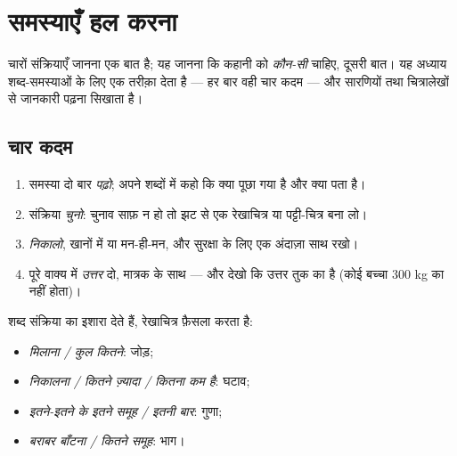 \chapter{समस्याएँ हल करना}\label{ch:g3:problems}

चारों संक्रियाएँ जानना एक बात है; यह जानना कि कहानी को
\emph{कौन-सी} चाहिए, दूसरी बात। यह अध्याय शब्द-समस्याओं के लिए
एक तरीक़ा देता है --- हर बार वही चार कदम --- और सारणियों तथा
चित्रालेखों से जानकारी पढ़ना सिखाता है।

\section{चार कदम}

\begin{method}\label{met:g3:problems:steps}
\begin{enumerate}
  \item समस्या दो बार \emph{पढ़ो}; अपने शब्दों में कहो कि क्या
        पूछा गया है और क्या पता है।
  \item संक्रिया \emph{चुनो}: चुनाव साफ़ न हो तो झट से एक
        रेखाचित्र या पट्टी-चित्र बना लो।
  \item \emph{निकालो}, खानों में या मन-ही-मन, और सुरक्षा के लिए
        एक अंदाज़ा साथ रखो।
  \item पूरे वाक्य में \emph{उत्तर} दो, मात्रक के साथ --- और
        देखो कि उत्तर तुक का है (कोई बच्चा
        $300$ kg का नहीं होता)।
\end{enumerate}
\end{method}

\begin{example}[कौन-सी संक्रिया?]\label{ex:g3:problems:which}
शब्द संक्रिया का इशारा देते हैं, रेखाचित्र फ़ैसला करता है:
\begin{itemize}
  \item \emph{मिलाना / कुल कितने}: जोड़;
  \item \emph{निकालना / कितने ज़्यादा / कितना कम है}:
        घटाव;
  \item \emph{इतने-इतने के इतने समूह / इतनी बार}:
        गुणा;
  \item \emph{बराबर बाँटना / कितने समूह}: भाग।
\end{itemize}
\end{example}

